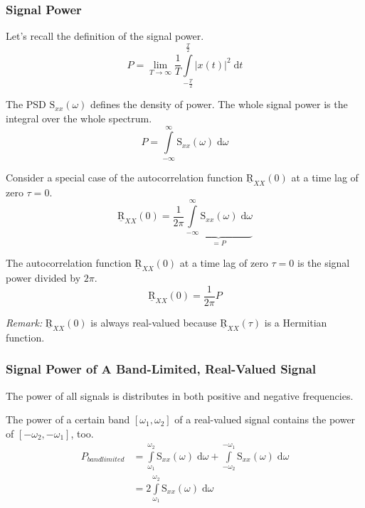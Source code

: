 \begin{refsection}
\subsubsection{Signal Power}

Let's recall the definition of the signal power.
\begin{equation}
	P = \lim\limits_{T \rightarrow \infty} \frac{1}{T} \int\limits_{-\frac{T}{2}}^{\frac{T}{2}} \left|x(t)\right|^2 \; \mathrm{d} t
\end{equation}

The \ac{PSD} $\mathrm{S}_{xx}(\omega)$ defines the density of power. The whole signal power is the integral over the whole spectrum.
\begin{equation}
	P = \int\limits_{-\infty}^{\infty} \mathrm{S}_{xx}(\omega) \; \mathrm{d} \omega
\end{equation}

Consider a special case of the autocorrelation function $\underline{\mathrm{R}}_{XX}(0)$ at a time lag of zero $\tau = 0$.
\begin{equation}
	\underline{\mathrm{R}}_{XX}(0) = \frac{1}{2 \pi} \underbrace{\int\limits_{-\infty}^{\infty} \mathrm{S}_{xx}(\omega) \; \mathrm{d} \omega}_{= P}
\end{equation}

The autocorrelation function $\underline{\mathrm{R}}_{XX}(0)$ at a time lag of zero $\tau = 0$ is the signal power divided by $2 \pi$.
\begin{equation}
	\underline{\mathrm{R}}_{XX}(0) = \frac{1}{2 \pi} P
\end{equation}

\textit{Remark:} $\underline{\mathrm{R}}_{XX}(0)$ is always real-valued because $\underline{\mathrm{R}}_{XX}(\tau)$ is a Hermitian function.

\subsubsection{Signal Power of A Band-Limited, Real-Valued Signal}

The power of all signals is distributes in both positive and negative frequencies.

The power of a certain band $[\omega_1, \omega_2]$ of a real-valued signal contains the power of $[-\omega_2, -\omega_1]$, too.
\begin{equation}
	\begin{split}
		P_{bandlimited} &= \int\limits_{\omega_1}^{\omega_2} \mathrm{S}_{xx}(\omega) \; \mathrm{d} \omega + \int\limits_{-\omega_2}^{-\omega_1} \mathrm{S}_{xx}(\omega) \; \mathrm{d} \omega \\
		 &= 2 \int\limits_{\omega_1}^{\omega_2} \mathrm{S}_{xx}(\omega) \; \mathrm{d} \omega
	\end{split}
\end{equation}


\end{refsection}
